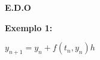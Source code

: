 \documentclass[a4paper,12pt]{article}
\begin{document}
\begin{center}
\textbf{E.D.O}
\end{center}

\textbf{Exemplo 1:}

$y_{n+1} = y_n + f(t_n,y_n)h$
\end{document}
